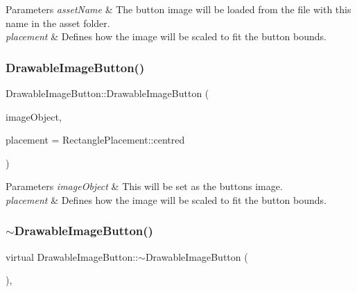 \begin{DoxyParams}{Parameters}
{\em asset\+Name} & The button image will be loaded from the file with this name in the asset folder.\\
\hline
{\em placement} & Defines how the image will be scaled to fit the button bounds. \\
\hline
\end{DoxyParams}
\mbox{\label{classDrawableImageButton_ad66c8a59c79f217bba34f83d7ed10c5f}} 
\subsubsection{\texorpdfstring{Drawable\+Image\+Button()}{DrawableImageButton()}\hspace{0.1cm}{\footnotesize\ttfamily [3/3]}}
{\footnotesize\ttfamily Drawable\+Image\+Button\+::\+Drawable\+Image\+Button (\begin{DoxyParamCaption}\item[{Image}]{image\+Object,  }\item[{Rectangle\+Placement}]{placement = {\ttfamily RectanglePlacement\+:\+:centred} }\end{DoxyParamCaption})}


\begin{DoxyParams}{Parameters}
{\em image\+Object} & This will be set as the button\textquotesingle{}s image.\\
\hline
{\em placement} & Defines how the image will be scaled to fit the button bounds. \\
\hline
\end{DoxyParams}
\mbox{\label{classDrawableImageButton_a77be515a68ea5d2f5dfef780dffd3435}} 
\subsubsection{\texorpdfstring{$\sim$\+Drawable\+Image\+Button()}{~DrawableImageButton()}}
{\footnotesize\ttfamily virtual Drawable\+Image\+Button\+::$\sim$\+Drawable\+Image\+Button (\begin{DoxyParamCaption}{ }\end{DoxyParamCaption})\hspace{0.3cm}{\ttfamily [inline]}, {\ttfamily [virtual]}}



